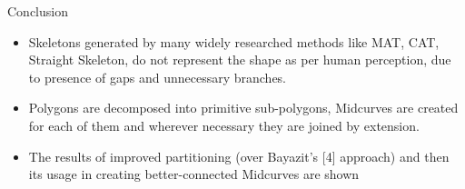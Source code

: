 
\begin{frame}[<+-| alert@+>]{Conclusion}
\begin{itemize}[noitemsep,label=\textbullet,topsep=2pt,parsep=2pt,partopsep=2pt]
\item Skeletons generated by many widely researched methods like MAT, CAT, Straight Skeleton, do not represent the shape as per human perception, due to presence of gaps and unnecessary branches.
\item Polygons are decomposed into primitive sub-polygons, Midcurves are created for each of them and wherever necessary they are joined by extension.
\item The results of improved partitioning (over Bayazit's [4] approach) and then its usage in creating better-connected Midcurves are shown
\end{itemize}


\end{frame}
